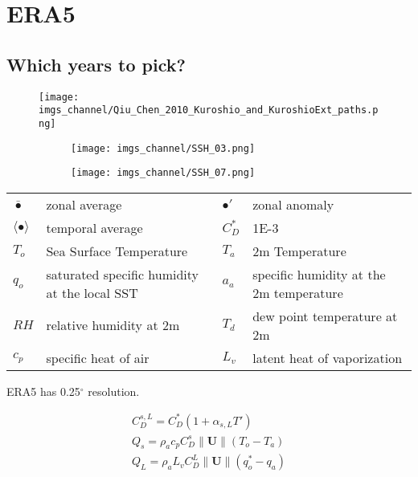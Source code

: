 \documentclass[12pt,a4paper]{article}
\newcommand{\Vmag}[1]{\| \mathbf{#1}\|}
\begin{document}
\newpage

\section{ERA5}


\subsection{Which years to pick?}

\begin{figure}[h!]
\texttt{[image: imgs\_channel/Qiu\_Chen\_2010\_Kuroshio\_and\_KuroshioExt\_paths.png]}
\caption{\citet{Aiu2010}}
\end{figure}

\begin{figure}[h!]
\centering
\begin{subfigure}[t]{0.49\textwidth}
\texttt{[image: imgs\_channel/SSH\_03.png]}
\end{subfigure}
\begin{subfigure}[t]{0.49\textwidth}
\texttt{[image: imgs\_channel/SSH\_07.png]}
\end{subfigure}
\end{figure}


\begin{table}[h!]
\begin{tabular}{llll}
$\bar{\bullet}$ & zonal average & $\bullet'$ & zonal anomaly\\
$\langle\bullet\rangle$ & temporal average & $C_D^*$ & 1E-3\\
$T_o$ & Sea Surface Temperature & $T_a$ & 2m Temperature\\
$q_o$ & saturated specific humidity at the local SST & $a_a$ & specific humidity at the 2m temperature \\
$RH$ & relative humidity at 2m & $T_d$ & dew point temperature at 2m\\
$c_p$ & specific heat of air & $L_v$ & latent heat of vaporization 
\end{tabular}

\end{table}

ERA5 has 0.25$^{\circ}$ resolution.

\begin{align}
C_D^{s,L} = C_D^*(1+\alpha_{s,L} T')\\
Q_s = \rho_a c_p C_D^s \Vmag{U} (T_o-T_a)\\
Q_L = \rho_a L_v C_D^L \Vmag{U} (q_o^*-q_a)
\end{align}
\end{document}
